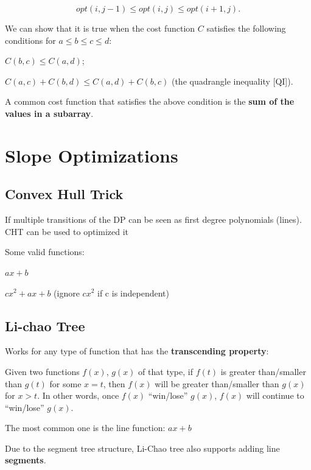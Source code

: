         $$opt(i, j-1) \leq opt(i, j) \leq opt(i+1, j).$$

        We can show that it is true when the cost function 
        $C$ satisfies the following conditions for $a \leq b \leq c \leq d$:

        $C(b, c) \leq C(a, d)$;

        $C(a, c) + C(b, d) \leq C(a, d) + C(b, c)$ (the quadrangle inequality [QI]).

        A common cost function that satisfies the above condition is the \textbf{sum of the values in a subarray}.


\section{Slope Optimizations}

    \subsection{Convex Hull Trick}

        If multiple transitions of the DP can be seen as 
        first degree polynomials (lines). CHT can be used to optimized it

        Some valid functions:

        $ax + b$
        
        $cx^2 + ax + b$ 
        (ignore $cx^2$ if c is independent)


    \subsection{Li-chao Tree}

        Works for any type of function that has the \textbf{transcending property}:

        Given two functions $f(x)$, $g(x)$ of that type, 
        if $f(t)$ is greater than/smaller than $g(t)$ for some $x=t$,
        then $f(x)$ will be greater than/smaller than $g(x)$ for $x>t$.
        In other words, once $f(x)$ “win/lose” $g(x)$, $f(x)$ will continue to “win/lose” $g(x)$.

        The most common one is the line function: $ax + b$

        Due to the segment tree structure, Li-Chao tree also supports adding line \textbf{segments}.


